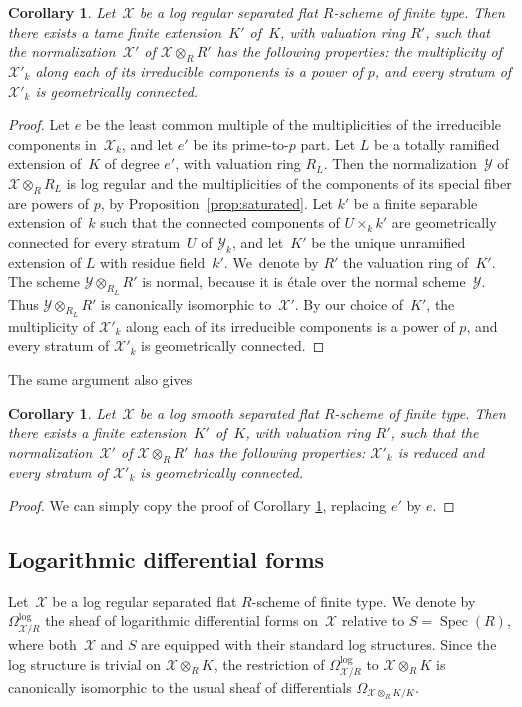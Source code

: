 \documentclass[11pt]{article}
\newtheorem{cor}[equation]{Corollary}
\theoremstyle{definition}
\numberwithin{equation}{subsection}
\newcommand{\cX}{\ensuremath{\mathscr{X}}}
\newcommand{\cY}{\ensuremath{\mathscr{Y}}}
\DeclareMathOperator{\Spec}{Spec}
\begin{document}
\begin{cor}\label{coro:ppower}
Let~$\cX$ be a log regular separated flat $R$\nobreakdash-scheme of finite type.
Then there exists a tame finite extension~$K'$ of~$K$, with valuation ring $R'$, such that
the normalization~$\cX'$ of $\cX\otimes_R R'$ has the following properties: the multiplicity of $\cX'_k$ along each of its
irreducible components is a power of $p$, and every stratum of $\cX'_k$ is geometrically connected.
\end{cor}
\begin{proof}
Let $e$ be the least common multiple of the multiplicities of the irreducible components in~$\cX_k$, and let $e'$ be its prime-to-$p$ part. Let $L$ be a totally ramified extension of~$K$ of degree $e'$, with valuation ring $R_L$. Then the normalization~$\cY$ of $\cX\otimes_R R_L$ is log regular and the multiplicities of the components of its special fiber are powers of $p$, by Proposition~\ref{prop:saturated}. Let $k'$ be a finite separable extension of~$k$ such that the connected components of $U\times_k k'$ are geometrically connected for every stratum~$U$ of $\cY_k$, and let~$K'$ be the unique unramified extension of $L$ with residue field~$k'$. We~denote by $R'$ the valuation ring of~$K'$. The scheme $\cY\otimes_{R_L} R'$ is normal, because it is étale over the normal scheme~$\cY$. Thus $\cY\otimes_{R_L} R'$ is canonically isomorphic to~$\cX'$. By our choice of~$K'$, the multiplicity of $\cX'_k$ along each of its irreducible components is a power of $p$, and every stratum of $\cX'_k$ is geometrically connected.
\end{proof}
The same argument also gives
\begin{cor}\label{coro:reduced}
Let~$\cX$ be a log smooth separated flat $R$\nobreakdash-scheme of finite type.
Then there exists a finite extension~$K'$ of~$K$, with valuation ring $R'$, such that
the normalization~$\cX'$ of $\cX\otimes_R R'$ has the following properties: $\cX'_k$ is reduced and every stratum of $\cX'_k$ is geometrically connected.
\end{cor}
\begin{proof}
We can simply copy the proof of Corollary \ref{coro:ppower}, replacing $e'$ by $e$.
\end{proof}

\subsection{Logarithmic differential forms}\label{ss:logdiff}
Let~$\cX$ be a log regular separated flat $R$\nobreakdash-scheme of finite type.
We denote by $\Omega^{\log}_{\cX/R}$ the sheaf of logarithmic differential forms on~$\cX$ relative to $S=\Spec(R)$, where both~$\cX$ and $S$ are equipped with their standard log structures. Since the log structure is trivial on $\cX\otimes_R K$, the restriction of $\Omega^{\log}_{\cX/R}$ to $\cX\otimes_R K$ is canonically isomorphic to the usual sheaf of differentials $\Omega_{\cX\otimes_R K/K}$.
\end{document}
